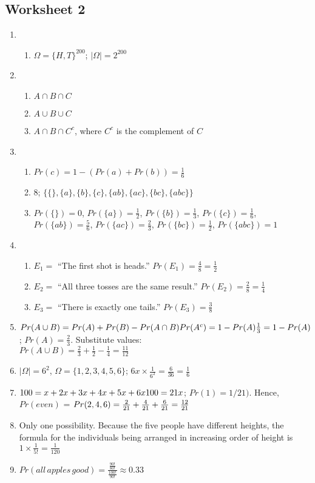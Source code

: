 \documentclass[12pt]{article}
\theoremstyle{plain}
\theoremstyle{definition}
\numberwithin{equation}{theorem}
\begin{document}
\subsection{Worksheet 2}
\begin{enumerate}
\addtocounter{enumi}{1}
\item
	\begin{enumerate}
	\item $\Omega = \{H,T\}^{200}$; $|\Omega| = 2^{200}$
	\end{enumerate}
\item
	\begin{enumerate}
	\item $A\cap B \cap C$
	\item $A\cup B \cup C$
	\item $A\cap B \cap C^{c}$, where $C^{c}$ is the complement of $C$
	\end{enumerate}
\item
	\begin{enumerate}
	\item $Pr(c) = 1-(Pr(a)+Pr(b)) = \frac{1}{6}$
	\item 8; $\big\{\{\},\{a\},\{b\},\{c\},\{ab\},\{ac\},\{bc\},\{abc\}\big\}$
	\item $Pr(\{\})=0$, $Pr(\{a\})=\frac{1}{2}$, $Pr(\{b\})=\frac{1}{3}$,  $Pr(\{c\})=\frac{1}{6}$,  $Pr(\{ab\})=\frac{5}{6}$,  $Pr(\{ac\})=\frac{2}{3}$,  $Pr(\{bc\})=\frac{1}{2}$,  $Pr(\{abc\})=1$
	\end{enumerate}
\item
	\begin{enumerate}
	\item $E_{1}=$ ``The first shot is heads.'' $Pr(E_{1}) = \frac{4}{8} = \frac{1}{2}$
	\item $E_{2}=$ ``All three tosses are the same result.''  $Pr(E_{2}) = \frac{2}{8} = \frac{1}{4}$
	\item $E_{3}=$ ``There is exactly one tails.'' $Pr(E_{3}) = \frac{3}{8} $
	\end{enumerate}
\item $Pr(A\cup B) = Pr(A) + Pr(B) - Pr(A\cap B)\\
Pr(A^{c}) = 1-Pr(A)\\
\frac{1}{3} = 1-Pr(A)$; $Pr(A) = \frac{2}{3}$. Substitute values:\\
$Pr(A\cup B) = \frac{2}{3} + \frac{1}{2} - \frac{1}{4} = \frac{11}{12}$
\item $|\Omega| = 6^{2}$, $\Omega = \{1,2,3,4,5,6\}$; $6 x\times \frac{1}{6^{2}} = \frac{6}{36} = \frac{1}{6}$ 
\addtocounter{enumi}{1}
\item $100 = x + 2x + 3x + 4x + 5x + 6x\\
100 = 21x$; $Pr(1) = 1/21)$. Hence, $Pr(even)$ = $Pr(2,4,6) = \frac{2}{21} + \frac{4}{21} + \frac{6}{21}\\
= \frac{12}{21}$
\addtocounter{enumi}{1}
\item Only one possibility. Because the five people have different heights, the formula for the individuals being arranged in increasing order of height is $1 \times \frac{1}{5!} = \frac{1}{120}$
\addtocounter{enumi}{2}
\item $Pr(all\,apples\,good) = \frac{\frac{90!}{80!}}{\frac{100!}{90!}} \approx 0.33$
\end{enumerate}
\end{document}
